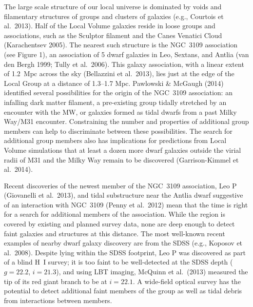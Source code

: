 The large scale structure of our local universe is dominated by voids and filamentary structures of groups and clusters of galaxies 
(e.g., Courtois et al.\ 2013).  Half of the Local Volume galaxies reside in loose groups and associations, such as the Sculptor filament 
and the Canes Venatici Cloud (Karachentsev 2005). The nearest such structure is the NGC~3109 association (see Figure 1), an
 association of 5 dwarf galaxies in Leo, Sextans, and Antlia (van den Bergh 1999; Tully et al.\ 2006). This galaxy association, 
 with a linear extent of 1.2~Mpc across the sky (Bellazzini et al.\ 2013), lies just at the edge of the Local Group at a distance of 
 1.3--1.7 Mpc. Pawlowski \& McGaugh (2014) identified several possibilities for the origin of the NGC~3109 association: 
  an infalling dark matter filament, a  pre-existing group tidally stretched by an encounter with the MW, or galaxies
 formed as tidal dwarfs from a past Milky Way/M31 encounter. Constraining the number and properties  of additional group
 members can help to discriminate between these possibilities. The search for additional group members
 also has implications for predictions from Local Volume simulations that  at least a dozen more dwarf galaxies 
 outside the virial radii of M31 and the Milky Way  remain to be discovered (Garrison-Kimmel et al.\ 2014).
 
Recent discoveries of  the newest member of the NGC~3109 association, Leo P (Giovanelli et al.\ 2013),
and tidal substructure near the Antlia dwarf suggestive of an interaction with NGC~3109 (Penny et al.\ 2012)
mean that the time is right for a search for additional members of the association. While the region is covered by existing  and planned
survey data, none are deep enough to detect  faint galaxies and  structures at this distance. The most
well-known recent examples of nearby dwarf galaxy discovery are from the SDSS (e.g., Koposov et al.\ 2008).
Despite lying within the SDSS footprint, Leo P was discovered as part of a blind H~I survey; it is too faint to
be well-detected at the SDSS  depth ($g=22.2$, $i=21.3$), and
using LBT imaging, McQuinn et al.\ (2013) measured the tip of its red giant branch to be at $i=22.1$.
A wide-field optical survey has the potential to detect
additional  faint members of the group as well as tidal debris from interactions between members.


